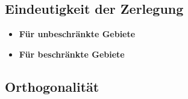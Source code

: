 \subsection{Eindeutigkeit der Zerlegung 
\label{helmholtz:subsection:EindeutigkeitS}}

\begin{itemize}
\item \textbf{Für unbeschränkte Gebiete}
\item \textbf{Für beschränkte Gebiete}
\end{itemize}


\subsection{Orthogonalität
\label{helmholtz:subsection:Orthogonalitaet}}

